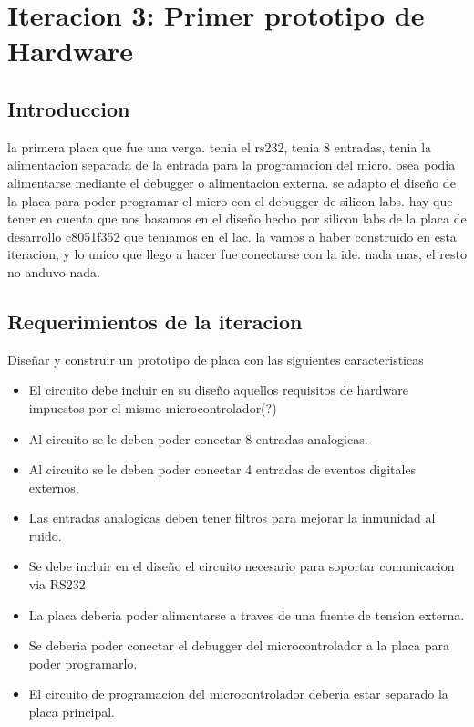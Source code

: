 \chapter{Iteracion 3: Primer prototipo de Hardware} %
\label{cha:iteracion_3}


\section{Introduccion} %
\label{sec:introduccion}

la primera placa que fue una verga. tenia el rs232, tenia 8 entradas, tenia la alimentacion separada de la entrada para la programacion del micro. osea podia alimentarse mediante el debugger o alimentacion externa. se adapto el diseño de la placa para poder programar el micro con el debugger de silicon labs. hay que tener en cuenta que nos basamos en el diseño hecho por silicon labs de la placa de desarrollo c8051f352 que teniamos en el lac. la vamos a haber construido en esta iteracion, y lo unico que llego a hacer fue conectarse con la ide. nada mas, el resto no anduvo nada. 


\section{Requerimientos de la iteracion} %
\label{sec:requerimientos_de_la_iteracion}

Diseñar y construir un prototipo de placa con las siguientes caracteristicas

\begin{itemize}
\item El circuito debe incluir en su diseño aquellos requisitos de hardware impuestos por el mismo microcontrolador(?)
\item Al circuito se le deben poder conectar 8 entradas analogicas.
\item Al circuito se le deben poder conectar 4 entradas de eventos digitales externos.
\item Las entradas analogicas deben tener filtros para mejorar la inmunidad al ruido.
\item Se debe incluir en el diseño el circuito necesario para soportar comunicacion via RS232
\item La placa deberia poder alimentarse a traves de una fuente de tension externa.
\item Se deberia poder conectar el debugger del microcontrolador a la placa para poder programarlo.
\item El circuito de programacion del microcontrolador deberia estar separado la placa principal.
\end{itemize}


